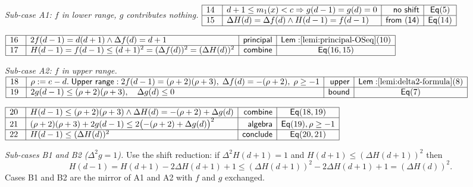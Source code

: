 \documentclass[11pt,reqno]{amsart}
\begin{document}
\noindent\textit{Sub-case A1: $f$ in lower range, $g$ contributes nothing.}
\noindent$%
\begin{array}{|m{0.5cm}|l|r|c|}
\hline
14 & d+1\le m_{1}(x)<c\Rightarrow g(d-1)=g(d)=0 & \mathsf{no\ shift} & 
\mathsf{Eq}(5) \\ \hline
15 & \Delta H(d)=\Delta f(d)\wedge H(d-1)=f(d-1) & \mathsf{from\ (14)} & 
\mathsf{Eq}(14) \\ \hline
\end{array}%
$

\nointerlineskip\noindent$%
\begin{array}{|m{0.5cm}|l|r|c|}
\hline
16 & 2f(d-1)=d(d+1)\wedge\Delta f(d)=d+1 & \mathsf{principal} & \mathsf{Lem:}%
\ref{lemi:principal-OSeq}(10) \\ \hline
17 & H(d-1)=f(d-1)\le(d+1)^{2}=(\Delta f(d))^{2}=(\Delta H(d))^{2} & \mathsf{%
combine} & \mathsf{Eq}(16,15) \\ \hline
\end{array}%
$

\noindent\textit{Sub-case A2: $f$ in upper range.} \noindent$%
\begin{array}{|m{0.5cm}|l|r|c|}
\hline
18 & \rho:=e-d.\;\mathsf{Upper\ range:}\;2f(d-1)=(\rho+2)(\rho+3),\;\Delta
f(d)=-(\rho+2),\;\rho\ge-1 & \mathsf{upper} & \mathsf{Lem:}\ref%
{lemi:delta2-formula}(8) \\ \hline
19 & 2g(d-1)\le(\rho+2)(\rho+3),\quad\Delta g(d)\le0 & \mathsf{bound} & 
\mathsf{Eq}(7) \\ \hline
\end{array}%
$

\nointerlineskip\noindent$%
\begin{array}{|m{0.5cm}|l|r|c|}
\hline
20 & H(d-1)\le(\rho+2)(\rho+3)\wedge\Delta H(d)=-(\rho+2)+\Delta g(d) & 
\mathsf{combine} & \mathsf{Eq}(18,19) \\ \hline
21 & (\rho+2)(\rho+3)+2g(d-1)\le2\bigl(-(\rho+2)+\Delta g(d)\bigr)^{2} & 
\mathsf{algebra} & \mathsf{Eq}(19),\rho\ge-1 \\ \hline
22 & H(d-1)\le(\Delta H(d))^{2} & \mathsf{conclude} & \mathsf{Eq}(20,21) \\ 
\hline
\end{array}%
$

\noindent\textit{Sub-cases B1 and B2 ($\Delta^{2}g=1$).} Use the shift
reduction: if $\Delta^{2}H(d+1)=1$ and $H(d+1)\le(\Delta H(d+1))^{2}$ then 
\begin{equation*}
H(d-1)=H(d+1)-2\Delta H(d+1)+1\le(\Delta H(d+1))^{2}-2\Delta
H(d+1)+1=(\Delta H(d))^{2}. 
\end{equation*}
Cases B1 and B2 are the mirror of A1 and A2 with $f$ and $g$ exchanged.
\end{document}
